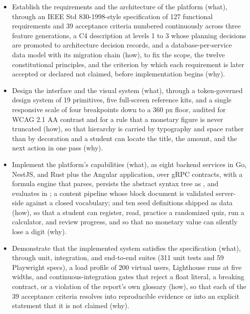 \begin{itemize}
  \item[OE1.] \label{oe1} Establish the requirements and the architecture of the
  platform (what), through an IEEE Std 830-1998-style specification of 127
  functional requirements and 39 acceptance criteria numbered continuously across
  three feature generations, a C4 description at levels 1 to 3 whose planning
  decisions are promoted to architecture decision records, and a
  database-per-service data model with its migration chain (how), to fix the scope,
  the twelve constitutional principles, and the criterion by which each requirement
  is later accepted or declared not claimed, before implementation begins (why).

  \item[OE2.] \label{oe2} Design the interface and the visual system (what), through
  a token-governed design system of 19 primitives, five full-screen reference kits,
  and a single responsive scale of four breakpoints down to a 360 px floor, audited
  for WCAG 2.1 AA contrast and for a rule that a monetary figure is never truncated
  (how), so that hierarchy is carried by typography and space rather than by
  decoration and a student can locate the title, the amount, and the next action in
  one pass (why).

  \item[OE3.] \label{oe3} Implement the platform's capabilities (what), as eight
  backend services in Go, NestJS, and Rust plus the Angular application, over gRPC
  contracts, with a formula engine that parses, persists the abstract syntax tree
  as , and evaluates in ; a content pipeline whose
  block document is validated server-side against a closed vocabulary; and ten seed
  definitions shipped as data (how), so that a student can register, read, practice
  a randomized quiz, run a calculator, and review progress, and so that no monetary
  value can silently lose a digit (why).

  \item[OE4.] \label{oe4} Demonstrate that the implemented system satisfies the
  specification (what), through unit, integration, and end-to-end suites (311 unit
  tests and 59 Playwright specs), a load profile of 200 virtual users, Lighthouse
  runs at five widths, and continuous-integration gates that reject a float
  literal, a breaking contract, or a violation of the report's own glossary (how),
  so that each of the 39 acceptance criteria resolves into reproducible evidence or
  into an explicit statement that it is not claimed (why).


\end{itemize}
